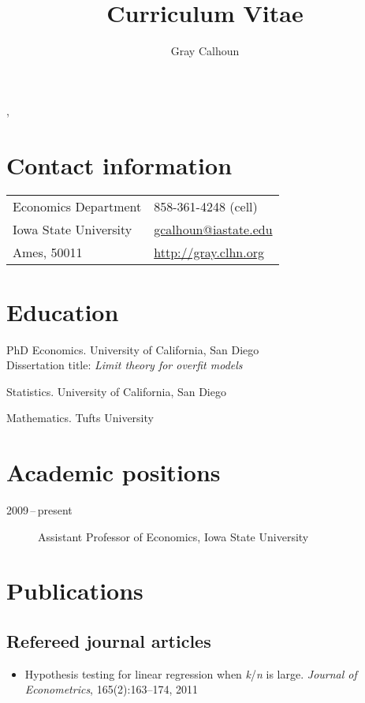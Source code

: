 \documentclass[11pt]{article}%
\author{Gray Calhoun}
\title{Curriculum Vitae}
\makeatletter
\newcommand{\allcaps}[1]{\textls[30]{\MakeUppercase{#1}}}
\def\maketitle{%
\begin{center}%
\par{\textls{\MakeUppercase{\textbf{\@author}}}}%
\vspace{\itemsep}%
\par{\@title, \@date}%
\end{center}%
}
\makeatother
\begin{document}
\maketitle

\section*{Contact information}
\begin{tabular}{@{}ll@{}}
Economics Department     & 858-361-4248 (cell)    \\
Iowa State University    & \url{gcalhoun@iastate.edu} \\
Ames, \allcaps{IA} 50011 & \url{http://gray.clhn.org}
\end{tabular}

\section*{Education}

\begin{description}[noitemsep]
\item[2009] PhD Economics. University of California, San Diego \\
Dissertation title: \textit{Limit theory for overfit models}
\item[2006] \allcaps{MS} Statistics. University of California, San Diego
\item[2001] \allcaps{BA} Mathematics. Tufts University
\end{description}

\section*{Academic positions}

\begin{description}
\item[2009\,--\,present] Assistant Professor of Economics, Iowa State University
\end{description}

\section*{Publications}
\subsection*{Refereed journal articles}

\begin{itemize}
\item Hypothesis testing for linear regression when
\textit{k}/\textit{n} is large. \textit{Journal of Econometrics},
165(2):163--174, 2011
\end{itemize}
\end{document}
